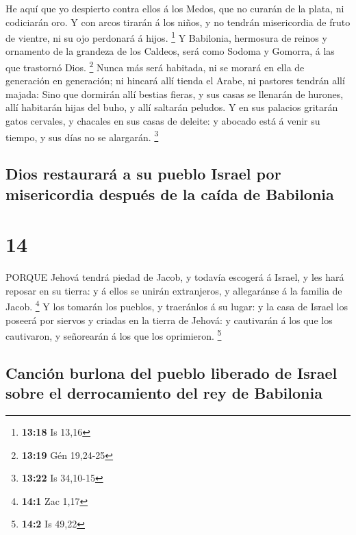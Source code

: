  He aquí que yo despierto contra ellos á los Medos, que no
curarán de la plata, ni codiciarán oro.  Y con arcos
tirarán á los niños, y no tendrán misericordia de fruto de vientre, ni
su ojo perdonará á hijos. \footnote{\textbf{13:18} Is 13,16}
 Y Babilonia, hermosura de reinos y ornamento de la
grandeza de los Caldeos, será como Sodoma y Gomorra, á las que trastornó
Dios. \footnote{\textbf{13:19} Gén 19,24-25}  Nunca más
será habitada, ni se morará en ella de generación en generación; ni
hincará allí tienda el Arabe, ni pastores tendrán allí majada:
 Sino que dormirán allí bestias fieras, y sus casas se
llenarán de hurones, allí habitarán hijas del buho, y allí saltarán
peludos.  Y en sus palacios gritarán gatos cervales, y
chacales en sus casas de deleite: y abocado está á venir su tiempo, y
sus días no se alargarán. \footnote{\textbf{13:22} Is 34,10-15}

\hypertarget{dios-restauraruxe1-a-su-pueblo-israel-por-misericordia-despuuxe9s-de-la-cauxedda-de-babilonia}{%
\subsection{Dios restaurará a su pueblo Israel por misericordia después
de la caída de
Babilonia}\label{dios-restauraruxe1-a-su-pueblo-israel-por-misericordia-despuuxe9s-de-la-cauxedda-de-babilonia}}

\hypertarget{section-13}{%
\section{14}\label{section-13}}

 PORQUE Jehová tendrá piedad de Jacob, y todavía escogerá á
Israel, y les hará reposar en su tierra: y á ellos se unirán
extranjeros, y allegaránse á la familia de Jacob. \footnote{\textbf{14:1}
  Zac 1,17}  Y los tomarán los pueblos, y traeránlos á su
lugar: y la casa de Israel los poseerá por siervos y criadas en la
tierra de Jehová: y cautivarán á los que los cautivaron, y señorearán á
los que los oprimieron. \footnote{\textbf{14:2} Is 49,22}

\hypertarget{canciuxf3n-burlona-del-pueblo-liberado-de-israel-sobre-el-derrocamiento-del-rey-de-babilonia}{%
\subsection{Canción burlona del pueblo liberado de Israel sobre el
derrocamiento del rey de
Babilonia}\label{canciuxf3n-burlona-del-pueblo-liberado-de-israel-sobre-el-derrocamiento-del-rey-de-babilonia}}

